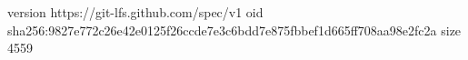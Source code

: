 version https://git-lfs.github.com/spec/v1
oid sha256:9827e772c26e42e0125f26ccde7e3c6bdd7e875fbbef1d665ff708aa98e2fc2a
size 4559
